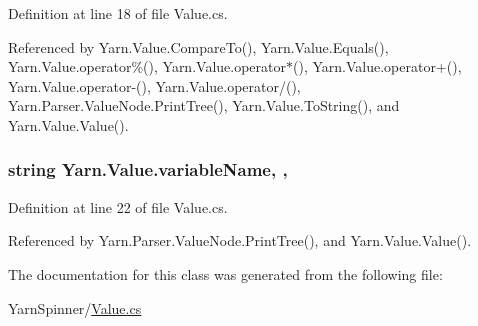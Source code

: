 Definition at line 18 of file Value.\-cs.



Referenced by Yarn.\-Value.\-Compare\-To(), Yarn.\-Value.\-Equals(), Yarn.\-Value.\-operator\%(), Yarn.\-Value.\-operator$\ast$(), Yarn.\-Value.\-operator+(), Yarn.\-Value.\-operator-\/(), Yarn.\-Value.\-operator/(), Yarn.\-Parser.\-Value\-Node.\-Print\-Tree(), Yarn.\-Value.\-To\-String(), and Yarn.\-Value.\-Value().

\hypertarget{a00181_a8ee2b09b7d28eaf97bf63c74d0023bfd}{
\subsubsection[{variable\-Name}]{\setlength{\rightskip}{0pt plus 5cm}string Yarn.\-Value.\-variable\-Name\hspace{0.3cm}{\ttfamily [get]}, {\ttfamily [set]}, {\ttfamily [package]}}}\label{a00181_a8ee2b09b7d28eaf97bf63c74d0023bfd}


Definition at line 22 of file Value.\-cs.



Referenced by Yarn.\-Parser.\-Value\-Node.\-Print\-Tree(), and Yarn.\-Value.\-Value().



The documentation for this class was generated from the following file\-:\begin{DoxyCompactItemize}
\item 
Yarn\-Spinner/\hyperlink{a00303}{Value.\-cs}\end{DoxyCompactItemize}
